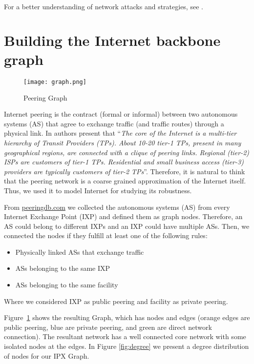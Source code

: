 \documentclass{sig-alternate-10pt}
\begin{document}
For a better understanding of network attacks and strategies, see  \cite{holme2002attack,molisz2006end,rak2010survivability, sydney2010characterising}. 

\section{Building the Internet backbone graph}
\label{graph}

\begin{figure}[ht!]
  \centering
  \texttt{[image: graph.png]}
  \caption{Peering Graph}
  \label{fig:graph}
\end{figure}

Internet peering is the contract (formal or informal) between two autonomous systems (AS) that agree to exchange traffic (and traffic routes) through a physical link. In \cite{Dhamdhere:2010:IFM:1921168.1921196} authors present that ``\textit{The core of the Internet is a multi-tier hierarchy of Transit Providers (TPs). About 10-20 tier-1 TPs, present in many geographical regions, are connected with a clique of peering links. Regional (tier-2) ISPs are customers of tier-1 TPs. Residential and small business access (tier-3) providers are typically customers of tier-2 TPs}''. Therefore, it is natural to think that the peering network is a coarse grained approximation of the Internet itself.  Thus, we used it to model Internet for studying its robustness.

From \url{peeringdb.com} we collected the autonomous systems (AS) from every Internet Exchange Point (IXP) and defined them as graph nodes. Therefore, an AS could belong to different IXPs and an IXP could have multiple ASs. Then, we connected the nodes if they fulfill at least one of the following rules:
\begin{itemize}
\item Physically linked ASs that exchange traffic 
\item ASs belonging to the same IXP
\item ASs belonging to the same facility
\end{itemize}
Where we considered IXP as public peering and facility as private peering.

Figure~\ref{fig:graph} shows the resulting Graph, which has  nodes and  edges  (orange edges are public peering, blue are private peering, and green are direct network connection). The resultant network has a well connected core network with some isolated nodes at the edges. In Figure \ref{fig:degree} we present a degree distribution of nodes for our IPX Graph.
\end{document}
